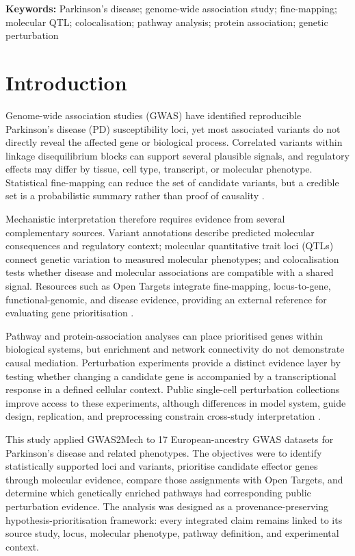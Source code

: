 \documentclass[11pt,a4paper]{article}
\begin{document}
\noindent\textbf{Keywords:} Parkinson's disease; genome-wide association study; fine-mapping; molecular QTL; colocalisation; pathway analysis; protein association; genetic perturbation

\clearpage
\tableofcontents

\clearpage

\section{Introduction}
\label{sec:introduction}

Genome-wide association studies (GWAS) have identified reproducible Parkinson's disease (PD) susceptibility loci, yet most associated variants do not directly reveal the affected gene or biological process. Correlated variants within linkage disequilibrium blocks can support several plausible signals, and regulatory effects may differ by tissue, cell type, transcript, or molecular phenotype. Statistical fine-mapping can reduce the set of candidate variants, but a credible set is a probabilistic summary rather than proof of causality \cite{Wang2020,Zou2022}.

Mechanistic interpretation therefore requires evidence from several complementary sources. Variant annotations describe predicted molecular consequences and regulatory context; molecular quantitative trait loci (QTLs) connect genetic variation to measured molecular phenotypes; and colocalisation tests whether disease and molecular associations are compatible with a shared signal. Resources such as Open Targets integrate fine-mapping, locus-to-gene, functional-genomic, and disease evidence, providing an external reference for evaluating gene prioritisation \cite{Mountjoy2021,OpenTargets2026Release}.

Pathway and protein-association analyses can place prioritised genes within biological systems, but enrichment and network connectivity do not demonstrate causal mediation. Perturbation experiments provide a distinct evidence layer by testing whether changing a candidate gene is accompanied by a transcriptional response in a defined cellular context. Public single-cell perturbation collections improve access to these experiments, although differences in model system, guide design, replication, and preprocessing constrain cross-study interpretation \cite{Peidli2024scPerturb,Squair2021FalseDiscoveries}.

This study applied GWAS2Mech to 17 European-ancestry GWAS datasets for Parkinson's disease and related phenotypes. The objectives were to identify statistically supported loci and variants, prioritise candidate effector genes through molecular evidence, compare those assignments with Open Targets, and determine which genetically enriched pathways had corresponding public perturbation evidence. The analysis was designed as a provenance-preserving hypothesis-prioritisation framework: every integrated claim remains linked to its source study, locus, molecular phenotype, pathway definition, and experimental context.
\end{document}
